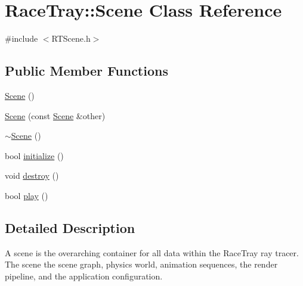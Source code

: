 \hypertarget{class_race_tray_1_1_scene}{\section{Race\-Tray\-:\-:Scene Class Reference}
\label{class_race_tray_1_1_scene}
}


{\ttfamily \#include $<$R\-T\-Scene.\-h$>$}

\subsection*{Public Member Functions}
\begin{DoxyCompactItemize}
\item 
\hyperlink{class_race_tray_1_1_scene_ab0b893217e6108982c963586a3eed7a1}{Scene} ()
\item 
\hyperlink{class_race_tray_1_1_scene_a64dbc6679f6543c06229efc87725532b}{Scene} (const \hyperlink{class_race_tray_1_1_scene}{Scene} \&other)
\item 
\hyperlink{class_race_tray_1_1_scene_af7c0fb4d0f3d4a10b50fb340376eed21}{$\sim$\-Scene} ()
\item 
bool \hyperlink{class_race_tray_1_1_scene_a6c01bc164fe3188f9de317b5176bcd18}{initialize} ()
\item 
void \hyperlink{class_race_tray_1_1_scene_abf3e9e56a8d5af553d0805fbdc807aeb}{destroy} ()
\item 
bool \hyperlink{class_race_tray_1_1_scene_a50293de9c949fbf279549d6618aa7dfb}{play} ()
\end{DoxyCompactItemize}


\subsection{Detailed Description}
A scene is the overarching container for all data within the Race\-Tray ray tracer. The scene the scene graph, physics world, animation sequences, the render pipeline, and the application configuration. 

